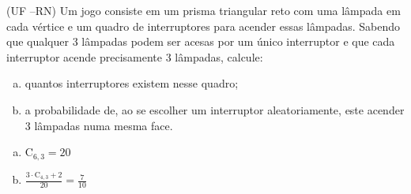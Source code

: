 \begin{ex}
(UF –RN) Um jogo consiste em um prisma triangular reto com uma lâmpada em cada vértice e um quadro de interruptores para acender essas lâmpadas. Sabendo que qualquer 3 lâmpadas podem ser acesas por um único interruptor e que cada interruptor acende precisamente 3 lâmpadas, calcule:
   \begin{enumerate}[(a)]
   \item quantos interruptores existem nesse quadro;
   \item a probabilidade de, ao se escolher um interruptor aleatoriamente, este acender 3 lâmpadas numa mesma face. 
   \end{enumerate}
     \begin{sol}
       \phantom{A} 
        \begin{enumerate} [(a)]
            \item $\mathrm{C}_{6,3}=20$
            \item $\frac{3\cdot\mathrm{C}_{4,3}+2}{20}=\frac{7}{10}$
        \end{enumerate}
     \end{sol}
\end{ex}